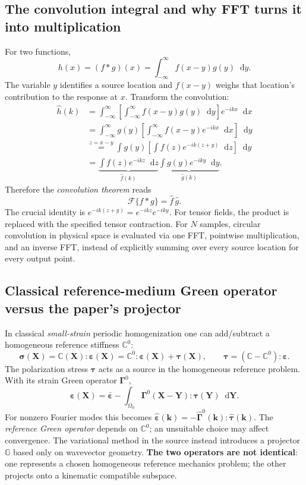 \documentclass[11pt,a4paper]{article}
\numberwithin{equation}{section}
\newcommand{\Gop}{\mathbb G}
\newcommand{\Xvec}{\mathbf X}
\newcommand{\FT}{\mathcal F}
\newcommand{\diff}{\mathop{}\!\mathrm d}
\begin{document}
\subsection{The convolution integral and why FFT turns it into multiplication}
For two functions,
\[
h(x)=(f*g)(x)=\int_{-\infty}^{\infty}f(x-y)g(y)\diff y.
\]
The variable $y$ identifies a source location and $f(x-y)$ weighs that location's contribution to the response at $x$. Transform the convolution:
\begin{align*}
\hat h(k)
&=\int_{-\infty}^{\infty}\!\!\left[\int_{-\infty}^{\infty}f(x-y)g(y)\diff y\right] e^{-ikx}\diff x\\
&=\int_{-\infty}^{\infty}g(y)\left[\int_{-\infty}^{\infty}f(x-y)e^{-ikx}\diff x\right]\diff y\\
&\overset{z=x-y}{=}\int g(y)\left[\int f(z)e^{-ik(z+y)}\diff z\right]\diff y\\
&=\underbrace{\int f(z)e^{-ikz}\diff z}_{\hat f(k)}
\underbrace{\int g(y)e^{-iky}\diff y}_{\hat g(k)}.
\end{align*}
Therefore the \emph{convolution theorem} reads
\[
\boxed{\FT\{f*g\}=\hat f\,\hat g.}
\]
The crucial identity is $e^{-ik(z+y)}=e^{-ikz}e^{-iky}$. For tensor fields, the product is replaced with the specified tensor contraction. For $N$ samples, circular convolution in physical space is evaluated via one FFT, pointwise multiplication, and an inverse FFT, instead of explicitly summing over every source location for every output point.

\subsection{Classical reference-medium Green operator versus the paper's projector}
In classical \emph{small-strain} periodic homogenization one can add/subtract a homogeneous reference stiffness $\mathbb C^0$:
\[
\bm\sigma(\Xvec)=\mathbb C(\Xvec):\bm\varepsilon(\Xvec)
=\mathbb C^0:\bm\varepsilon(\Xvec)+\bm\tau(\Xvec),\qquad
\bm\tau=(\mathbb C-\mathbb C^0):\bm\varepsilon.
\]
The polarization stress $\bm\tau$ acts as a source in the homogeneous reference problem. With its strain Green operator $\bm\Gamma^0$,
\[
\bm\varepsilon(\Xvec)=\bar{\bm\varepsilon}
-\int_{\Omega_0}\bm\Gamma^0(\Xvec-\mathbf Y):\bm\tau(\mathbf Y)\diff\mathbf Y.
\]
For nonzero Fourier modes this becomes $\hat{\bm\varepsilon}(\mathbf k)=-\hat{\bm\Gamma}^0(\mathbf k):\hat{\bm\tau}(\mathbf k)$. The \emph{reference Green operator} depends on $\mathbb C^0$; an unsuitable choice may affect convergence. The variational method in the source instead introduces a projector $\Gop$ based only on wavevector geometry. \textbf{The two operators are not identical}: one represents a chosen homogeneous reference mechanics problem; the other projects onto a kinematic compatible subspace.
\end{document}
